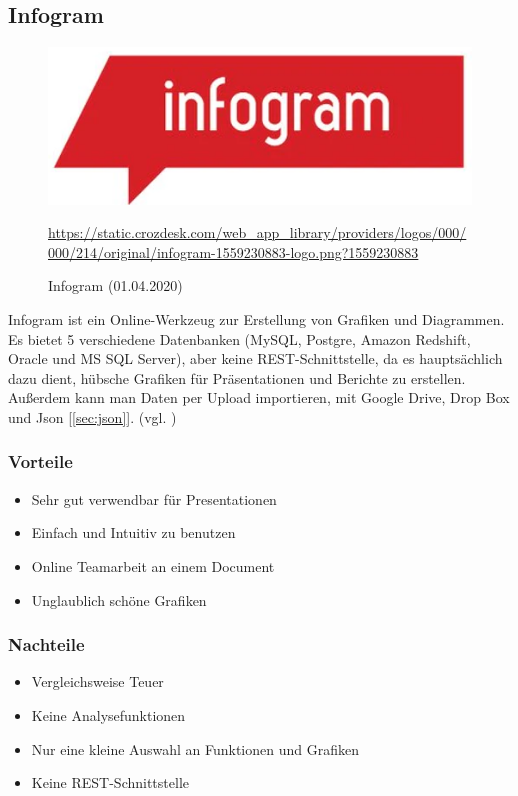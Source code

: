 \subsection{Infogram}
\begin{figure}[H]
    \includegraphics[scale=1]{images/infogramLogo.PNG}
    \caption{Infogram (01.04.2020)}
     \centering
     \url{https://static.crozdesk.com/web_app_library/providers/logos/000/000/214/original/infogram-1559230883-logo.png?1559230883} 
\end{figure}
Infogram ist ein Online-Werkzeug zur Erstellung von Grafiken und Diagrammen.
Es bietet 5 verschiedene Datenbanken (MySQL, Postgre, Amazon Redshift, Oracle und MS SQL Server), aber keine REST-Schnittstelle, da es hauptsächlich dazu dient, hübsche Grafiken für Präsentationen und Berichte zu erstellen.
Außerdem kann man Daten per Upload importieren, mit Google Drive, Drop Box und Json [\ref{sec:json}]. (vgl. \cite{noauthor_infogram_2019})
\subsubsection{Vorteile} 
\begin{itemize}
\item Sehr gut verwendbar für Presentationen
\item Einfach und Intuitiv zu benutzen
\item Online Teamarbeit an einem Document
\item Unglaublich schöne Grafiken
\end{itemize}
\subsubsection{Nachteile}
\begin{itemize}
\item Vergleichsweise Teuer
\item Keine Analysefunktionen
\item Nur eine kleine Auswahl an Funktionen und Grafiken
\item Keine REST-Schnittstelle
\end{itemize}
